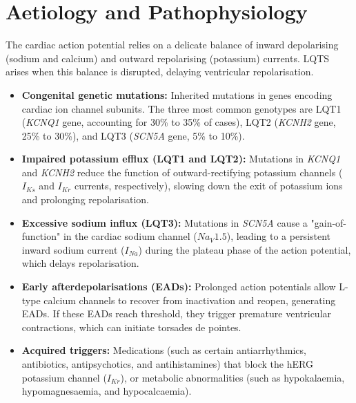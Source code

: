 \section*{Aetiology and Pathophysiology}
The cardiac action potential relies on a delicate balance of inward depolarising (sodium and calcium) and outward repolarising (potassium) currents. LQTS arises when this balance is disrupted, delaying ventricular repolarisation.
\begin{itemize}
    \item \textbf{Congenital genetic mutations:} Inherited mutations in genes encoding cardiac ion channel subunits. The three most common genotypes are LQT1 (\textit{KCNQ1} gene, accounting for 30\% to 35\% of cases), LQT2 (\textit{KCNH2} gene, 25\% to 30\%), and LQT3 (\textit{SCN5A} gene, 5\% to 10\%).
    \item \textbf{Impaired potassium efflux (LQT1 and LQT2):} Mutations in \textit{KCNQ1} and \textit{KCNH2} reduce the function of outward-rectifying potassium channels ($I_{Ks}$ and $I_{Kr}$ currents, respectively), slowing down the exit of potassium ions and prolonging repolarisation.
    \item \textbf{Excessive sodium influx (LQT3):} Mutations in \textit{SCN5A} cause a "gain-of-function" in the cardiac sodium channel ($Na_V1.5$), leading to a persistent inward sodium current ($I_{Na}$) during the plateau phase of the action potential, which delays repolarisation.
    \item \textbf{Early afterdepolarisations (EADs):} Prolonged action potentials allow L-type calcium channels to recover from inactivation and reopen, generating EADs. If these EADs reach threshold, they trigger premature ventricular contractions, which can initiate torsades de pointes.
    \item \textbf{Acquired triggers:} Medications (such as certain antiarrhythmics, antibiotics, antipsychotics, and antihistamines) that block the hERG potassium channel ($I_{Kr}$), or metabolic abnormalities (such as hypokalaemia, hypomagnesaemia, and hypocalcaemia).
\end{itemize}

